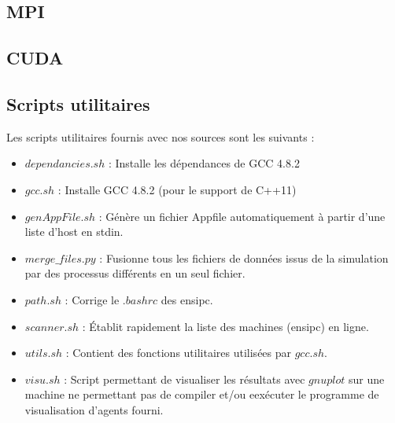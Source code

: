 \documentclass[12pt,a4paper,sans]{article}
\begin{document}
\subsection{MPI}

\subsection{CUDA}

\subsection{Scripts utilitaires}
Les scripts utilitaires fournis avec nos sources sont les suivants :
\begin{itemize}
    \item $dependancies.sh$ : Installe les dépendances de GCC 4.8.2 
    \item $gcc.sh$          : Installe GCC 4.8.2 (pour le support de C++11)
    \item $genAppFile.sh$   : Génère un fichier Appfile automatiquement à partir d'une liste d'host en stdin.
    \item $merge\_files.py$ : Fusionne tous les fichiers de données issus de la simulation par des processus différents en un seul fichier.
    \item $path.sh$         : Corrige le $.bashrc$ des ensipc.
    \item $scanner.sh$      : Établit rapidement la liste des machines (ensipc) en ligne.
    \item $utils.sh$        : Contient des fonctions utilitaires utilisées par $gcc.sh$.
    \item $visu.sh$         : Script permettant de visualiser les résultats avec $gnuplot$ sur une machine ne permettant pas de compiler et/ou eexécuter le programme de visualisation d'agents fourni.
\end{itemize}
\end{document}
